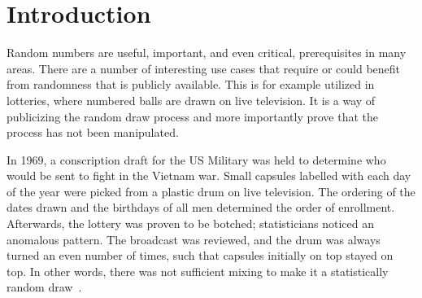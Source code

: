 \section{Introduction}\label{cha:introduction}

Random numbers are useful, important, and even critical, prerequisites in many areas.
There are a number of interesting use cases that require or could benefit from randomness that is publicly available. This is for example utilized in lotteries, where numbered balls are drawn on live television. It is a way of publicizing the random draw process and more importantly prove that the process has not been manipulated.


In 1969, a conscription draft for the US Military was held to determine who would be sent to fight in the Vietnam war. Small capsules labelled with each day of the year were picked from a plastic drum on live television.
The ordering of the dates drawn and the birthdays of all men determined the order of enrollment.
Afterwards, the lottery was proven to be botched; statisticians noticed an anomalous pattern.
The broadcast was reviewed, and the drum was always turned an even number of times, such that capsules initially on top stayed on top.
In other words, there was not sufficient mixing to make it a statistically random draw~\cite{princeton2016}.

